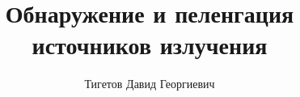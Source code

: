 \documentclass[a4paper,12pt]{report}
\begin{document}
\title{Обнаружение и пеленгация источников излучения}
\author{Тигетов Давид Георгиевич}
\maketitle

\tableofcontents





\end{document}
